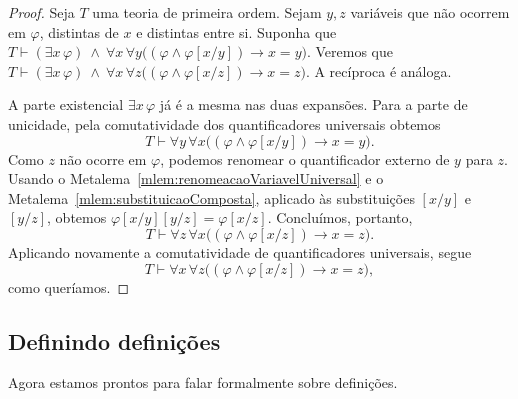 \begin{proof}
    Seja $T$ uma teoria de primeira ordem.
    Sejam $y, z$ variáveis que não ocorrem em $\varphi$, distintas de $x$ e distintas entre si.
    Suponha que $T\vdash (\exists x\,\varphi)\ \wedge\ \forall x\,\forall y\bigl((\varphi \wedge \varphi[x/y])\rightarrow x=y\bigr)$.
    Veremos que $T\vdash (\exists x\,\varphi)\ \wedge\ \forall x\,\forall z\bigl((\varphi \wedge \varphi[x/z])\rightarrow x=z\bigr)$.
    A recíproca é análoga.

    A parte existencial $\exists x\,\varphi$ já é a mesma nas duas expansões.
    Para a parte de unicidade, pela comutatividade dos quantificadores universais obtemos
    \[
        T\vdash \forall y\,\forall x\bigl((\varphi \wedge \varphi[x/y])\rightarrow x=y\bigr).
    \]
    Como $z$ não ocorre em $\varphi$, podemos renomear o quantificador externo de $y$ para $z$.
    Usando o Metalema~\ref{mlem:renomeacaoVariavelUniversal} e o
    Metalema~\ref{mlem:substituicaoComposta}, aplicado às substituições
    $[x/y]$ e $[y/z]$, obtemos
    $\varphi[x/y][y/z]=\varphi[x/z]$.
    Concluímos, portanto,
    \[
        T\vdash \forall z\,\forall x\bigl((\varphi \wedge \varphi[x/z])\rightarrow x=z\bigr).
    \]
    Aplicando novamente a comutatividade de quantificadores universais, segue
    \[
        T\vdash \forall x\,\forall z\bigl((\varphi \wedge \varphi[x/z])\rightarrow x=z\bigr),
    \]
    como queríamos.
\end{proof}

\subsection{Definindo definições}\label{subsec:definindoDefinicoes}
Agora estamos prontos para falar formalmente sobre definições.

